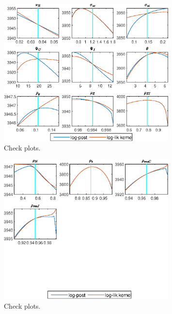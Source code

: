 \begin{figure}[H]
\centering 
\includegraphics[width=0.80\textwidth]{RBC_sectoral/graphs/RBC_sectoral_CheckPlots3}
\caption{Check plots.}\label{Fig:CheckPlots:3}
\end{figure}
 
\begin{figure}[H]
\centering 
\includegraphics[width=0.80\textwidth]{RBC_sectoral/graphs/RBC_sectoral_CheckPlots4}
\caption{Check plots.}\label{Fig:CheckPlots:4}
\end{figure}
 

